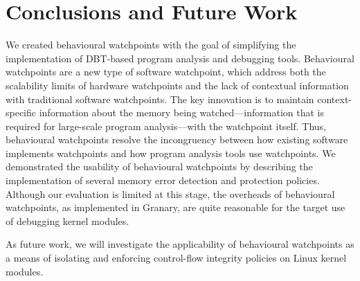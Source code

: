 \documentclass[letterpaper,twocolumn,10pt]{article}
\begin{document}
\section{Conclusions and Future Work}

We created behavioural watchpoints with the goal of simplifying the implementation of DBT-based program analysis and debugging tools. Behavioural watchpoints are a new type of software watchpoint, which address both the scalability limits of hardware watchpoints and the lack of contextual information with traditional software watchpoints.  The key innovation is to maintain context-specific information about the memory being watched---information that is required for large-scale program analysis---with the watchpoint itself.  Thus, behavioural watchpoints resolve the incongruency between how existing software implements watchpoints and how program analysis tools use watchpoints. We demonstrated the usability of behavioural watchpoints by describing the implementation of several memory error detection and protection policies.  Although our evaluation is limited at this stage, the overheads of behavioural watchpoints, as implemented in Granary, are quite reasonable for the target use of debugging kernel modules.

As future work, we will investigate the applicability of behavioural watchpoints as a means of isolating and enforcing control-flow integrity policies on Linux kernel modules.








\end{document}
